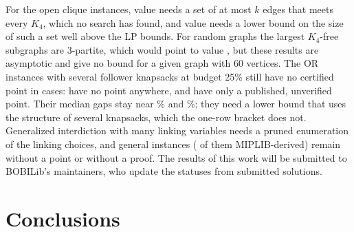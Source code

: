 \documentclass[]{spie}  %
\theoremstyle{plain}
\begin{document}
For the \NumCliqueOpen{} open clique instances, value \CliqueOpenLower{} needs a set of at most
$k$ edges that meets every $K_4$, which no search has found, and value \CliqueOpenUpper{} needs a
lower bound on the size of such a set well above the LP bounds. For random graphs the
largest $K_4$-free subgraphs are 3-partite,\cite{babai1990extremal,brightwell2012extremal} which
would point to value \CliqueOpenUpper{}, but these results are asymptotic and give no bound for a
given graph with 60 vertices. The OR instances with several follower knapsacks at budget 25\% still
have no certified point in \NumOrSeveralQuarterNoPoint{} cases: \NumOrQuarterNoPointNoPub{} have no
point anywhere, and \NumOrQuarterNoPointPub{} have only a published, unverified point. Their median
gaps stay near \OrGapZeroQuarterNow\% and \OrGapFiftyQuarterNow\%; they need a lower bound that uses
the structure of several knapsacks, which the one-row bracket does not. Generalized interdiction with
many linking variables needs a pruned enumeration of the linking choices, and
\NumGeneralUnchanged{} general instances (\NumGeneralUnchangedMiplib{} of them MIPLIB-derived)
remain without a point or without a proof. The results of this work will be submitted to BOBILib's
maintainers, who update the statuses from submitted solutions.

\section{Conclusions}\label{sec:conclusions}
\end{document}
